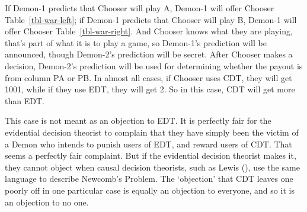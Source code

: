 \documentclass[
  12pt,
  letterpaper,
  DIV=11,
  numbers=noendperiod]{scrreprt}
\begin{document}
\begin{table}

\caption{\label{tbl-edt-war}A Newcomb problem with two demons.}

\begin{minipage}[t]{0.50\linewidth}



\end{minipage}%
%
\begin{minipage}[t]{0.50\linewidth}



\end{minipage}%

\end{table}%

If Demon-1 predicts that Chooser will play A, Demon-1 will offer Chooser
Table~\ref{tbl-war-left}; if Demon-1 predicts that Chooser will play B,
Demon-1 will offer Chooser Table~\ref{tbl-war-right}. And Chooser knows
what they are playing, that's part of what it is to play a game, so
Demon-1's prediction will be announced, though Demon-2's prediction will
be secret. After Chooser makes a decision, Demon-2's prediction will be
used for determining whether the payout is from column PA or PB. In
almost all cases, if Chooser uses CDT, they will get 1001, while if they
use EDT, they will get 2. So in this case, CDT will get more than EDT.

This case is not meant as an objection to EDT. It is perfectly fair for
the evidential decision theorist to complain that they have simply been
the victim of a Demon who intends to punish users of EDT, and reward
users of CDT. That seems a perfectly fair complaint. But if the
evidential decision theorist makes it, they cannot object when causal
decision theorists, such as Lewis (), use
the same language to describe Newcomb's Problem. The `objection' that
CDT leaves one poorly off in one particular case is equally an objection
to everyone, and so it is an objection to no one.
\end{document}
